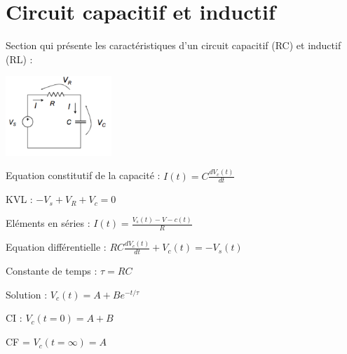 \documentclass[11pt]{report}
\begin{document}
\section{Circuit capacitif et inductif}
Section qui présente les caractéristiques d'un circuit capacitif (RC) et inductif (RL) : \newline
\begin{framed}
  \includegraphics[width=4cm]{9.png}\newline

   Equation constitutif de la capacité :  $I(t) = C\frac{dV_c(t)}{dt}$\newline

   KVL : $-V_s + V_R + V_c = 0$ \newline

   Eléments en séries : $I(t) = \frac{V_s(t)-V-c(t)}{R}$\newline

   Equation différentielle : $RC\frac{dV_c(t)}{dt} + V_c(t) = -V_s(t)$\newline

   Constante de temps : $\tau = RC$\newline

   Solution : $V_c(t) = A + Be^{-t/\tau}$\newline

   CI : $V_c(t=0) = A + B$\newline

   CF = $V_c(t=\infty) = A$\newline
\end{framed}
\newpage
\end{document}
